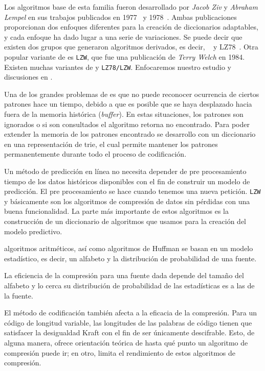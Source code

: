  
Los algoritmos base de esta familia fueron desarrollado por \emph{Jacob Ziv} y \emph{Abraham Lempel} en sus trabajos publicados en 1977~\cite{ZivLempel1977} y 1978~\cite{ZivLempel1978}. Ambas publicaciones proporcionan dos enfoques diferentes para la creación de diccionarios adaptables, y cada enfoque ha dado lugar a una serie de variaciones. Se puede decir que existen dos grupos que generaron algoritmos derivados, es decir, \lzSieteSiete~\cite{ZivLempel1977} y LZ78~\cite{ZivLempel1978}. Otra popular variante  de \lzSieteOcho es \texttt{LZW}, que fue una publicación de \emph{Terry Welch} en 1984. Existen muchas variantes de \lzSieteSiete y \texttt{LZ78/LZW}. Enfocaremos nuestro estudio y discusiones en \lzSieteOcho. 


Una de los grandes problemas de \lzSieteSiete es que no puede reconocer ocurrencia de ciertos patrones hace un tiempo, debido a que es posible que se haya desplazado hacia fuera de la memoria histórica (\emph{buffer}). En estas situaciones, los patrones son ignorados o si son consultados el algoritmo retorna no encontrado. Para poder extender la memoria de los patrones encontrado se desarrollo \lzSieteOcho con un diccionario en una representación de trie, el cual permite mantener los patrones permanentemente durante todo el proceso de codificación.



Un método de predicción en línea no necesita depender de pre procesamiento tiempo de los datos históricos disponibles con el fin de construir un modelo de predicción. El pre procesamiento se hace cuando tenemos una nueva petición. \texttt{LZW} y \lzSieteOcho básicamente son los algoritmos de compresión de datos sin pérdidas con una buena funcionalidad. La parte más importante de estos algoritmos es la construcción de un diccionario de algoritmos que usamos para la creación del modelo predictivo. 






algoritmos aritméticos, así como algoritmos de Huffman se basan en un modelo estadístico, es decir, un alfabeto y la distribución de probabilidad de una fuente. 

La eficiencia de la compresión para una fuente dada depende del tamaño del alfabeto y lo cerca su distribución de probabilidad de las estadísticas es a las de la fuente. 


El método de codificación también afecta a la eficacia de la compresión. 
Para un código de longitud variable, las longitudes de las palabras de código tienen que satisfacer la desigualdad Kraft con el fin de ser únicamente descifrable. Esto, de alguna manera, ofrece orientación teórica de hasta qué punto un algoritmo de compresión puede ir; en otro, limita el rendimiento de estos algoritmos de compresión.

